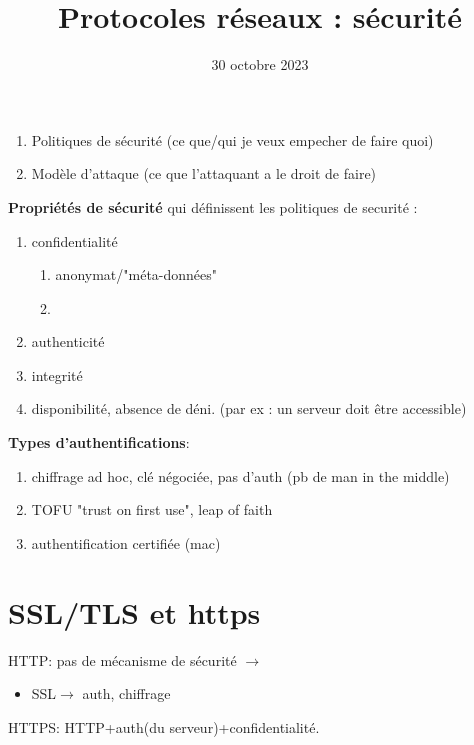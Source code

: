 \documentclass[12pt]{article}
\title{Protocoles réseaux : sécurité}
\date{30 octobre 2023}
\theoremstyle{plain}
\theoremstyle{definition}
\theoremstyle{remark}
\begin{document}
\maketitle
\begin{enumerate}
    \item Politiques de sécurité (ce que/qui je veux empecher de faire quoi)
    \item Modèle d'attaque (ce que l'attaquant a le droit de faire)
\end{enumerate}

\noindent \textbf{Propriétés de sécurité} qui définissent les politiques de securité :
\begin{enumerate}
    \item confidentialité \begin{enumerate}
        \item anonymat/"méta-données"
        \item 
    \end{enumerate}
    \item authenticité
    \item integrité
    \item disponibilité, absence de déni. (par ex : un serveur doit être accessible)
\end{enumerate}

\noindent \textbf{Types d'authentifications}:
\begin{enumerate}
    \item chiffrage ad hoc, clé négociée, pas d'auth (pb de man in the middle)
    \item TOFU "trust on first use", leap of faith
    \item authentification certifiée (mac)
\end{enumerate}

\section{SSL/TLS et https}
HTTP: pas de mécanisme de sécurité $\rightarrow$ \begin{itemize}
    \item SSL$\rightarrow$ auth, chiffrage
\end{itemize}

HTTPS: HTTP+auth(du serveur)+confidentialité.
\end{document}
